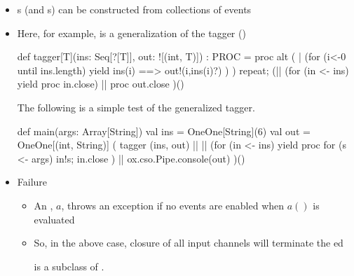 \documentclass{concdistfoils}
\begin{document}
\begin{slide}
\begin{itemize}
\item {}s (and s) can be constructed from collections of events
\item Here, for example, is a generalization of the tagger ()
\vfill
\begin{hideobj}{csoexamples/MultiTagger}
package csoexamples

object MultiTagger
{ import ox.CSO._
  
\end{hideobj}
\begin{obj}{}
  def tagger[T](ins: Seq[?[T]], out: ![(int, T)]) : PROC = proc
  { alt ( 
        | (for (i<-0 until ins.length) yield ins(i) ==> { out!(i,ins(i)?) })
        ) repeat;    
    (|| (for (in <- ins) yield proc {in.close})
     || proc {out.close} 
    )()  
  }
\end{obj}
\begin{note} 
The following is a simple test of the generalized tagger.

\begin{obj}{}
  def main(args: Array[String])
  { val ins = OneOne[String](6)
    val out = OneOne[(int, String)]
    (  tagger (ins, out)
    || || (for (in <- ins) yield proc { for (s <- args) in!s; in.close })
    || ox.cso.Pipe.console(out)
    )()
  }
\end{obj}
\end{note}
\begin{hideobj}{}
}
\end{hideobj}
\vfill
\item Failure
\begin{itemize}
\item An , $a$, throws an  exception if no events are 
      enabled when  $a()$ is evaluated 
\item[] So, in the above case, closure of all input channels 
        will terminate the ed 
\begin{note}
 is a subclass of .
\end{note}
\end{itemize}
\end{itemize}
\end{slide}
\end{document}
